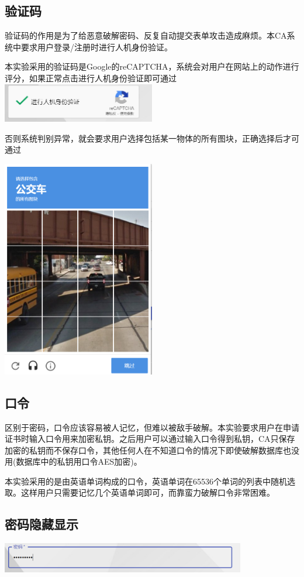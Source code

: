 \documentclass{ctexart}
\begin{document}
\subsection{验证码}
验证码的作用是为了给恶意破解密码、反复自动提交表单攻击造成麻烦。本CA系统中要求用户登录/注册时进行人机身份验证。

本实验采用的验证码是Google的reCAPTCHA，系统会对用户在网站上的动作进行评分，如果正常点击进行人机身份验证即可通过\\

\includegraphics[width=0.5\textwidth]{Clipboard_2021-01-01-16-51-30.png}


否则系统判别异常，就会要求用户选择包括某一物体的所有图块，正确选择后才可通过

\includegraphics[width=0.5\textwidth]{Clipboard_2021-01-01-16-53-28.png}
\subsection{口令}
区别于密码，口令应该容易被人记忆，但难以被敌手破解。本实验要求用户在申请证书时输入口令用来加密私钥。之后用户可以通过输入口令得到私钥，CA只保存加密的私钥而不保存口令，其他任何人在不知道口令的情况下即使破解数据库也没用(数据库中的私钥用口令AES加密)。

本实验采用的是由英语单词构成的口令，英语单词在65536个单词的列表中随机选取。这样用户只需要记忆几个英语单词即可，而靠蛮力破解口令非常困难。
\subsection{密码隐藏显示}
\includegraphics[width=0.8\textwidth]{Clipboard_2021-01-01-17-36-14.png}
\end{document}
